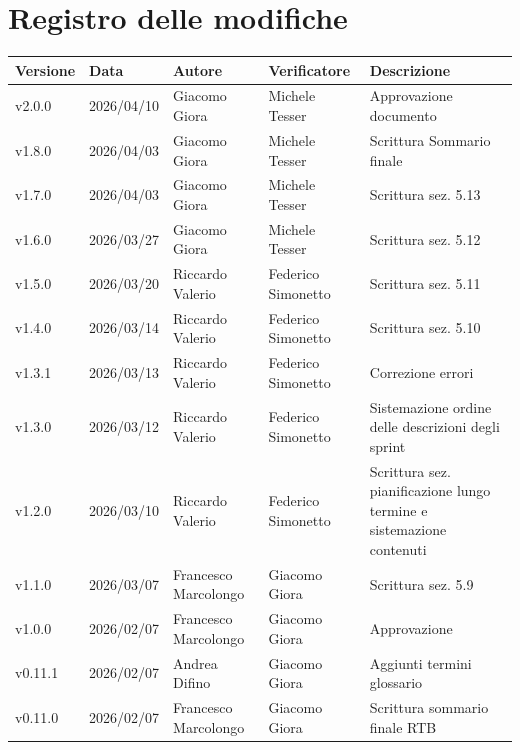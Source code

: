 \documentclass[a4paper,12pt]{article}
\begin{document}
\section*{Registro delle modifiche}
    \begin{center}
        \begin{tabularx}{\textwidth}{|l|l|l|X|X|}
            \hline
            \rowcolor{lightgray}
            \textbf{Versione} & \textbf{Data} & \textbf{Autore} & \textbf{Verificatore} & \textbf{Descrizione} \\
            \hline
            v2.0.0 & 2026/04/10 & Giacomo Giora & Michele Tesser & Approvazione documento \\
            \hline
            v1.8.0 & 2026/04/03 & Giacomo Giora & Michele Tesser & Scrittura Sommario finale\\
            \hline
            v1.7.0 & 2026/04/03 & Giacomo Giora & Michele Tesser & Scrittura sez. 5.13\\
            \hline
            v1.6.0 & 2026/03/27 & Giacomo Giora & Michele Tesser & Scrittura sez. 5.12\\
            \hline
            v1.5.0 & 2026/03/20 & Riccardo Valerio & Federico Simonetto & Scrittura sez. 5.11\\
             \hline
            v1.4.0 & 2026/03/14 & Riccardo Valerio & Federico Simonetto & Scrittura sez. 5.10\\
            \hline
            v1.3.1 & 2026/03/13 & Riccardo Valerio & Federico Simonetto & Correzione errori \\
            \hline
            v1.3.0 & 2026/03/12 & Riccardo Valerio & Federico Simonetto & Sistemazione ordine delle descrizioni degli sprint \\
            \hline
            v1.2.0 & 2026/03/10 & Riccardo Valerio & Federico Simonetto & Scrittura sez. pianificazione lungo termine e sistemazione contenuti \\
            \hline
            v1.1.0 & 2026/03/07 & Francesco Marcolongo & Giacomo Giora & Scrittura sez. 5.9\\
            \hline	
            v1.0.0 & 2026/02/07 & Francesco Marcolongo & Giacomo Giora & Approvazione \\
            \hline
            v0.11.1 & 2026/02/07 & Andrea Difino & Giacomo Giora & Aggiunti termini glossario \\
            \hline
            v0.11.0 & 2026/02/07 & Francesco Marcolongo & Giacomo Giora & Scrittura sommario finale RTB\\

\end{tabularx}
\end{center}
\end{document}
